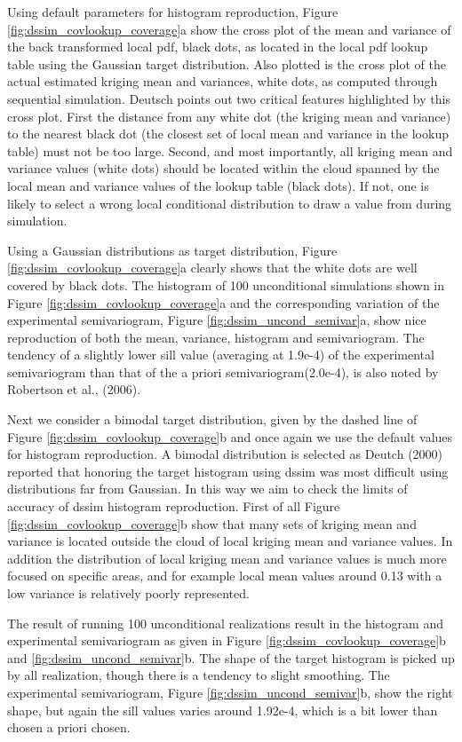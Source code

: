 \documentclass[12t]{article}
\begin{document}
Using default parameters for histogram reproduction,
Figure \ref{fig:dssim_covlookup_coverage}a show the cross plot of the mean and variance of the back
transformed local pdf, black dots,
as located in the local pdf lookup table using the Gaussian target distribution. Also plotted is the cross plot of the actual estimated kriging mean and variances, white dots, as
computed through sequential simulation. 
Deutsch points out two critical features highlighted by this cross plot. First the distance from any white dot (the kriging mean and variance) to the nearest black dot (the closest set of local mean and variance in the lookup table) must not be too large. Second, and most importantly, all kriging mean and variance values (white dots) should be located within the cloud spanned by the local mean and variance values of the lookup table (black dots). If not, one is likely to select a wrong local conditional distribution to draw a value from during simulation.

Using a Gaussian distributions as target distribution, Figure
\ref{fig:dssim_covlookup_coverage}a clearly shows that the white dots
are well covered by black dots. The histogram of 100 unconditional
simulations shown in Figure \ref{fig:dssim_covlookup_coverage}a and the corresponding variation of the experimental semivariogram, Figure \ref{fig:dssim_uncond_semivar}a, show nice reproduction of both the mean, variance, histogram and semivariogram. The tendency of a slightly lower sill value (averaging at 1.9e-4) of the experimental semivariogram than that of the a priori semivariogram(2.0e-4), is also noted by Robertson et al., (2006). 

Next we consider a bimodal target distribution, given by the dashed
line of Figure \ref{fig:dssim_covlookup_coverage}b and once again we
use the default values for histogram reproduction. A bimodal
distribution is selected as Deutch (2000) reported that honoring the target histogram using dssim was most difficult using distributions far from Gaussian. In this way we aim to check the limits of accuracy of dssim histogram reproduction.
First of all Figure \ref{fig:dssim_covlookup_coverage}b show that many sets of kriging mean and variance is located outside the cloud of local kriging mean and variance values. In addition the distribution of local kriging mean and variance values is much more focused on specific areas, and for example local mean values around 0.13 with a low variance is relatively poorly represented. 

The result of running 100 unconditional realizations result in the
histogram and experimental semivariogram as given in Figure
\ref{fig:dssim_covlookup_coverage}b and \ref{fig:dssim_uncond_semivar}b. The shape of the target histogram is picked up by all realization, though there is a tendency to slight smoothing. The experimental semivariogram, Figure \ref{fig:dssim_uncond_semivar}b, show the right shape, but again the sill values varies around 1.92e-4, which is a bit lower than chosen a priori chosen.
\end{document}
